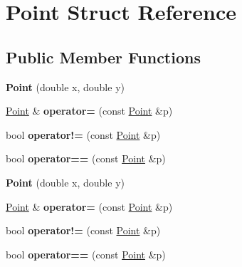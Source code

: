 \hypertarget{structPoint}{\section{Point Struct Reference}
\label{structPoint}
}
\subsection*{Public Member Functions}
\begin{DoxyCompactItemize}
\item 
\hypertarget{structPoint_a78b55e8d5466bb8c2cf60fa55f2562ff}{{\bfseries Point} (double x, double y)}\label{structPoint_a78b55e8d5466bb8c2cf60fa55f2562ff}

\item 
\hypertarget{structPoint_a79ef74eec8fb41f7ec213beea9b1c3ac}{\hyperlink{structPoint}{Point} \& {\bfseries operator=} (const \hyperlink{structPoint}{Point} \&p)}\label{structPoint_a79ef74eec8fb41f7ec213beea9b1c3ac}

\item 
\hypertarget{structPoint_ae4c751e084aaa166a65f56788170a9e9}{bool {\bfseries operator!=} (const \hyperlink{structPoint}{Point} \&p)}\label{structPoint_ae4c751e084aaa166a65f56788170a9e9}

\item 
\hypertarget{structPoint_a1a69a0a1dea189f07e044f6eb868937d}{bool {\bfseries operator==} (const \hyperlink{structPoint}{Point} \&p)}\label{structPoint_a1a69a0a1dea189f07e044f6eb868937d}

\item 
\hypertarget{structPoint_a78b55e8d5466bb8c2cf60fa55f2562ff}{{\bfseries Point} (double x, double y)}\label{structPoint_a78b55e8d5466bb8c2cf60fa55f2562ff}

\item 
\hypertarget{structPoint_a79ef74eec8fb41f7ec213beea9b1c3ac}{\hyperlink{structPoint}{Point} \& {\bfseries operator=} (const \hyperlink{structPoint}{Point} \&p)}\label{structPoint_a79ef74eec8fb41f7ec213beea9b1c3ac}

\item 
\hypertarget{structPoint_ae4c751e084aaa166a65f56788170a9e9}{bool {\bfseries operator!=} (const \hyperlink{structPoint}{Point} \&p)}\label{structPoint_ae4c751e084aaa166a65f56788170a9e9}

\item 
\hypertarget{structPoint_a1a69a0a1dea189f07e044f6eb868937d}{bool {\bfseries operator==} (const \hyperlink{structPoint}{Point} \&p)}\label{structPoint_a1a69a0a1dea189f07e044f6eb868937d}

\end{DoxyCompactItemize}
